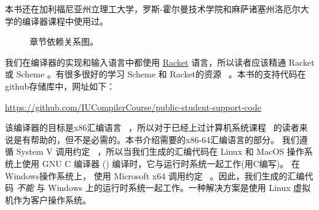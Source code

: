 \documentclass[11pt]{book}
\begin{document}
本书还在加利福尼亚州立理工大学，罗斯-霍尔曼技术学院和麻萨诸塞州洛厄尔大学的编译器课程中使用过。


\begin{figure}[tp]
  \caption{章节依赖关系图。}
  \label{fig:chapter-dependences}
\end{figure}

我们在编译器的实现和输入语言中都使用 \href{https://racket-lang.org/}{Racket} 语言，所以读者应该精通 Racket 或 Scheme 。有很多很好的学习 Scheme 和 Racket的资源~\citep{Dybvig:1987aa,Abelson:1996uq,Friedman:1996aa,Felleisen:2001aa,Felleisen:2013aa,Flatt:2014aa} 。本书的支持代码在github存储库中，网址如下：
\begin{center}\small
  \url{https://github.com/IUCompilerCourse/public-student-support-code}
\end{center}

该编译器的目标是x86汇编语言~\citep{Intel:2015aa} ，所以对于已经上过计算机系统课程~\citep{Bryant:2010aa} 的读者来说是有帮助的，但不是必需的。本书介绍需要的x86-64汇编语言的部分。
%
我们遵循 System V 调用约定~\citep{Bryant:2005aa,Matz:2013aa} ，所以当我们生成的汇编代码在 Linux 和 MacOS 操作系统上使用 GNU C 编译器 () 编译时，它与运行时系统一起工作(用C编写)。
%
在Windows操作系统上，  使用 Microsoft x64 调用约定~\citep{Microsoft:2018aa,Microsoft:2020aa} 。因此，我们生成的汇编代码 \emph{不能} 与 Windows 上的运行时系统一起工作。一种解决方案是使用 Linux 虚拟机作为客户操作系统。
\end{document}
